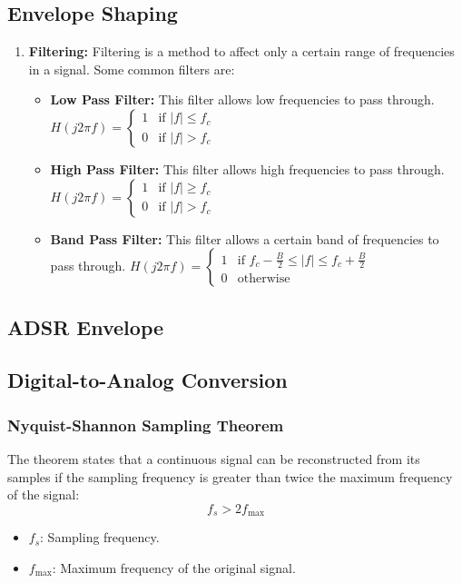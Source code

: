 \documentclass[12pt]{article}
\begin{document}
\subsection{Envelope Shaping}
\begin{enumerate}
    \item \textbf{Filtering:} Filtering is a method to affect only a certain range of frequencies in a signal. Some common filters are:
    \begin{itemize}
        \item \textbf{Low Pass Filter:} This filter allows low frequencies to pass through.
            $H(j2\pi f) = 
            \begin{cases} 
            1 & \text{if } |f| \leq f_c \\
            0 & \text{if } |f| > f_c 
            \end{cases}$
        \item \textbf{High Pass Filter:} This filter allows high frequencies to pass through.
            $H(j2\pi f) = 
            \begin{cases} 
            1 & \text{if } |f| \geq f_c \\
            0 & \text{if } |f| > f_c 
            \end{cases}$
        \item \textbf{Band Pass Filter:} This filter allows a certain band of frequencies to pass through.
            $H(j2\pi f) = 
            \begin{cases} 
            1 & \text{if } f_c - \frac{B}{2} \leq |f| \leq f_c + \frac{B}{2} \\
            0 & \text{otherwise} 
            \end{cases}$
    \end{itemize}


\end{enumerate}

\subsection{ADSR Envelope}


\subsection{Digital-to-Analog Conversion}
\subsubsection{Nyquist-Shannon Sampling Theorem}
The theorem states that a continuous signal can be reconstructed from its samples if the sampling frequency is greater than 
twice the maximum frequency of the signal:
\begin{equation}
    f_s > 2 f_{\text{max}}
\end{equation}
\begin{itemize}
    \item $f_s$: Sampling frequency.
    \item $f_{\text{max}}$: Maximum frequency of the original signal.
\end{itemize}
\end{document}
